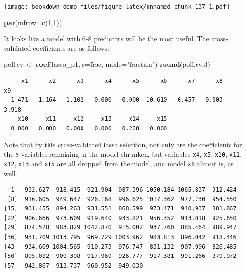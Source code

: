 \documentclass[]{book}
\newenvironment{Shaded}{\begin{snugshade}}{\end{snugshade}}
\newcommand{\KeywordTok}[1]{\textcolor[rgb]{0.13,0.29,0.53}{\textbf{#1}}}
\newcommand{\DataTypeTok}[1]{\textcolor[rgb]{0.13,0.29,0.53}{#1}}
\newcommand{\DecValTok}[1]{\textcolor[rgb]{0.00,0.00,0.81}{#1}}
\newcommand{\StringTok}[1]{\textcolor[rgb]{0.31,0.60,0.02}{#1}}
\newcommand{\OperatorTok}[1]{\textcolor[rgb]{0.81,0.36,0.00}{\textbf{#1}}}
\newcommand{\NormalTok}[1]{#1}
\theoremstyle{definition}
\theoremstyle{definition}
\theoremstyle{definition}
\theoremstyle{remark}
\begin{document}
\texttt{[image: bookdown-demo\_files/figure-latex/unnamed-chunk-137-1.pdf]}

\begin{Shaded}
\begin{Highlighting}[]
\KeywordTok{par}\NormalTok{(}\DataTypeTok{mfrow=}\KeywordTok{c}\NormalTok{(}\DecValTok{1}\NormalTok{,}\DecValTok{1}\NormalTok{))}
\end{Highlighting}
\end{Shaded}

It looks like a model with 6-8 predictors will be the most useful. The
cross-validated coefficients are as follows:

\begin{Shaded}
\begin{Highlighting}[]
\NormalTok{poll.cv <-}\StringTok{ }\KeywordTok{coef}\NormalTok{(lasso_p1, }\DataTypeTok{s=}\NormalTok{frac, }\DataTypeTok{mode=}\StringTok{"fraction"}\NormalTok{)}
\KeywordTok{round}\NormalTok{(poll.cv,}\DecValTok{3}\NormalTok{)}
\end{Highlighting}
\end{Shaded}

\begin{verbatim}
     x1      x2      x3      x4      x5      x6      x7      x8      x9 
  1.471  -1.164  -1.102   0.000   0.000 -10.610  -0.457   0.003   3.918 
    x10     x11     x12     x13     x14     x15 
  0.000   0.000   0.000   0.000   0.228   0.000 
\end{verbatim}

Note that by this cross-validated lasso selection, not only are the
coefficients for the 8 variables remaining in the model shrunken, but
variables \texttt{x4}, \texttt{x5}, \texttt{x10}, \texttt{x11},
\texttt{x12}, \texttt{x13} and \texttt{x15} are all dropped from the
model, and model \texttt{x8} almost is, as well.

\begin{Shaded}
\end{Shaded}

\begin{verbatim}
 [1]  932.627  918.415  921.904  987.396 1050.184 1065.837  912.424
 [8]  916.605  949.647  926.168  996.625 1017.362  977.730  954.550
[15]  931.455  894.263  931.551  868.599  973.471  940.937  881.867
[22]  906.666  973.609  919.640  933.821  956.352  913.018  925.650
[29]  874.528  983.829 1042.870  915.002  937.760  885.464  989.947
[36]  931.709 1013.795  969.729 1003.962  983.813  896.042  918.446
[43]  934.609 1004.565  910.273  976.747  831.132  907.996  826.485
[50]  895.082  909.398  917.969  926.777  917.381  991.266  879.972
[57]  942.867  913.737  960.952  949.030
\end{verbatim}
\end{document}
